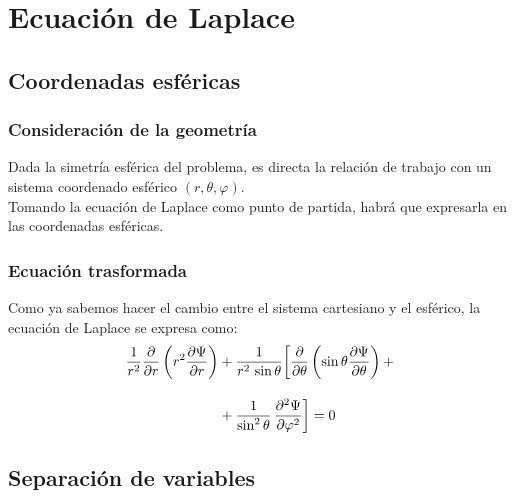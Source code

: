 \documentclass[12pt]{beamer}
\begin{document}
\section{Ecuación de Laplace}
\subsection{Coordenadas esféricas}

\begin{frame}
\frametitle{Consideración de la geometría}
Dada la simetría esférica del problema, es directa la relación de trabajo con un sistema coordenado esférico $(r, \theta, \varphi)$.
\\
\bigskip
\pause
Tomando la ecuación de Laplace como punto de partida, habrá que expresarla en las coordenadas esféricas.
\end{frame}
\begin{frame}
\frametitle{Ecuación trasformada}
Como ya sabemos hacer el cambio entre el sistema cartesiano y el esférico, la ecuación de Laplace se expresa como:
\begin{align}
\begin{aligned}[b]
\dfrac{1}{r^{2}} \pdv{r} \left( r^{2} \pdv{\Psi}{r} \right) &+ \dfrac{1}{r^{2} \, \sin \theta} \bigg[ \pdv{\theta} \left( \sin \theta \pdv{\Psi}{\theta} \right) + \\[1em]
&+ \dfrac{1}{\sin^{2} \theta} \, \pdv[2]{\Psi}{\varphi} \bigg] = 0
\end{aligned}
\label{eq:ecuacion_22_15}
\end{align}
\end{frame}

\subsection{Separación de variables}
\end{document}
